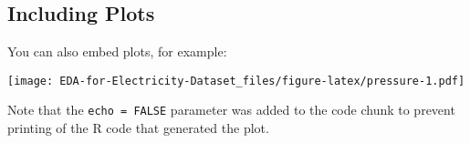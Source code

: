\documentclass[
]{article}
\begin{document}
\subsection{Including Plots}\label{including-plots}

You can also embed plots, for example:

\texttt{[image: EDA-for-Electricity-Dataset\_files/figure-latex/pressure-1.pdf]}

Note that the \texttt{echo\ =\ FALSE} parameter was added to the code
chunk to prevent printing of the R code that generated the plot.
\end{document}
